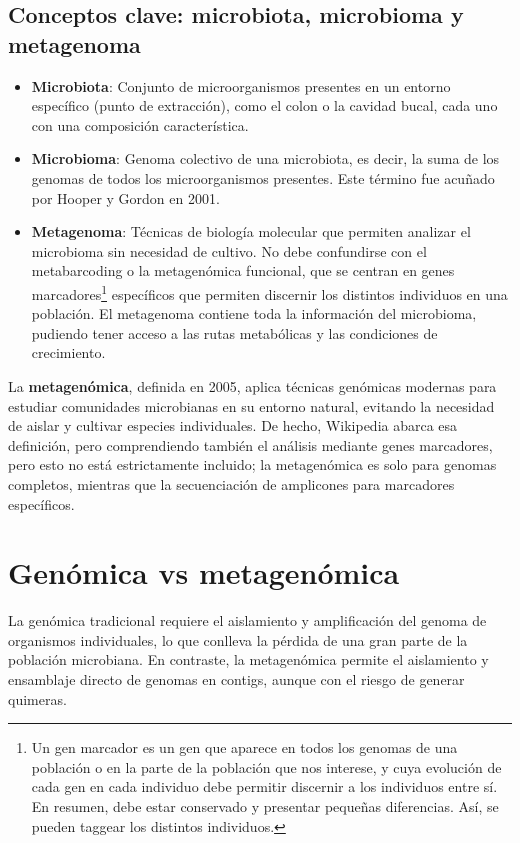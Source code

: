 \subsection{Conceptos clave: microbiota, microbioma y metagenoma}
\begin{itemize}
\item \textbf{Microbiota}: Conjunto de microorganismos presentes en un entorno específico (punto de extracción), como el colon o la cavidad bucal, cada uno con una composición característica.
\item \textbf{Microbioma}: Genoma colectivo de una microbiota, es decir, la suma de los genomas de todos los microorganismos presentes. Este término fue acuñado por Hooper y Gordon en 2001.
\item \textbf{Metagenoma}: Técnicas de biología molecular que permiten analizar el microbioma sin necesidad de cultivo. No debe confundirse con el metabarcoding o la metagenómica funcional, que se centran en genes marcadores\footnote{Un gen marcador es un gen que aparece en todos los genomas de una población o en la parte de la población que nos interese, y cuya evolución de cada gen en cada individuo debe permitir discernir a los individuos entre sí. En resumen, debe estar conservado y presentar pequeñas diferencias. Así, se pueden taggear los distintos individuos.} específicos que permiten discernir los distintos individuos en una población. El metagenoma contiene toda la información del microbioma, pudiendo tener acceso a las rutas metabólicas y las condiciones de crecimiento.
\end{itemize}

La \textbf{metagenómica}, definida en 2005, aplica técnicas genómicas modernas para estudiar comunidades microbianas en su entorno natural, evitando la necesidad de aislar y cultivar especies individuales. De hecho, Wikipedia abarca esa definición, pero comprendiendo también el análisis mediante genes marcadores, pero esto no está estrictamente incluido; la metagenómica es solo para genomas completos, mientras que la secuenciación de amplicones para marcadores específicos.

\section{Genómica vs metagenómica}
La genómica tradicional requiere el aislamiento y amplificación del genoma de organismos individuales, lo que conlleva la pérdida de una gran parte de la población microbiana. En contraste, la metagenómica permite el aislamiento y ensamblaje directo de genomas en contigs, aunque con el riesgo de generar quimeras.

